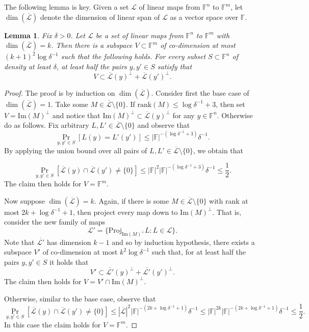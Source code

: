 \documentclass[12pt]{article}
\newcommand{\F}{\mathbb{F}}
\newcommand{\LL}{\mathcal{L}}
\newcommand{\Img}{\text{Im}}
\newcommand{\proj}{\textrm{Proj}}
\newtheorem{lemma}[theorem]{Lemma}
\begin{document}
The following lemma is key.
Given a set $\LL$ of linear maps from $\F^n$ to $\F^m$, let $\dim(\overline{\LL})$ denote the dimension of linear span of $\LL$ as a vector space over $\F$.
\begin{lemma}\label{lemma:mapsubspace}
	Fix $\delta>0$. Let $\LL$ be a set of linear maps from $\F^n$ to $\F^m$ with $\dim(\overline{\LL})=k$.
Then there is a subspace $V\subset \F^m$ of co-dimension at most $(k+1)^2\log \delta^{-1}$ such that the following holds.
For every subset $S\subset \F^n$ of density at least $\delta$, at least half the pairs $y,y'\in S$ satisfy that
	$$V \subset  \overline{\LL}(y)^{\perp} + \overline{\LL}(y')^{\perp}. $$
\end{lemma}
\begin{proof}
	The proof is by induction on $\dim(\overline{\LL})$. Consider first the base case of $\dim(\overline{\LL})=1$. Take some $ M\in \overline{\LL}\setminus\{0\}$. If $\text{rank}(M) \leq  \log \delta^{-1}+3$, then set $V = \Img(M)^\perp$ and notice that $ \Img(M)^\perp \subset \overline{\LL}(y)^{\perp}$ for any $y \in \F^n$.
	Otherwise do as follows. Fix arbitrary $L,L'\in \overline{\LL}\setminus \{0\}$ and observe that
	$$\Pr_{y,y'\in S} \left[ L(y) = L'(y')\right] \le |\F|^{-(\log \delta^{-1}+3)}\delta^{-1}.$$
	By applying the union bound over all pairs of $L,L'\in  \overline{\LL}\setminus \{0\}$, we obtain that

	$$\Pr_{y,y'\in S} \left[  \overline{\LL}(y) \cap \overline{\LL}(y') \neq \{0\}\right] \le |\F|^2|\F|^{-(\log \delta^{-1}+3)}\delta^{-1}\leq \frac{1}{2}.$$
The claim then holds for $V=\F^m$.


	Now suppose $\dim(\overline{\LL}) = k$. Again, if there is some $M\in \overline{\LL}\setminus \{0\}$ with rank at most $ 2k+\log\delta^{-1} + 1$, then project every map down to $\Img(M)^\perp$. That is, consider the new family of maps
	$$\LL' =\{\proj_{\Img(M)^\perp}L: L\in \LL\}.$$
	Note that $\overline{\LL'}$ has dimension $k-1$ and so by induction hypothesis, there exists
a subspace $V'$ of co-dimension at most $k^2\log \delta^{-1}$ such that, for at least half the pairs $y,y'\in S$ it holds that
	$$V'\subset \overline{\LL'}(y)^{\perp}+\overline{\LL'}(y')^{\perp}.$$
	The claim then holds for $V = V' \cap \Img(M)^\perp$.

Otherwise, similar to the base case, observe that
	$$\Pr_{y,y'\in S} \left[  \overline{\LL}(y) \cap \overline{\LL}(y') \neq \{0\}\right] \le |\overline{\LL}|^2|\F|^{-(2k+\log\delta^{-1} + 1)}\delta^{-1}\leq |\F|^{2k}|\F|^{-(2k+\log\delta^{-1} + 1)}\delta^{-1}\leq \frac{1}{2}.$$
In this case the claim holds for $V=\F^m$.

\end{proof}
\end{document}
